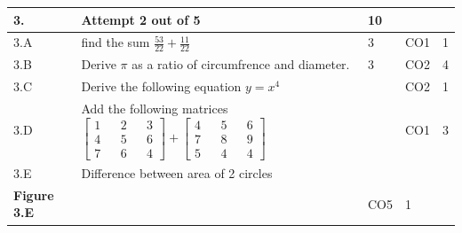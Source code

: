 \documentclass[12pt]{article}
\begin{document}
\begin{longtable}{|L{1cm}|L{8cm}|C{1cm}|C{1cm}|C{1cm}|}\hline
	\bf3. & \bf{Attempt} \bf{2} \bf{out of} \bf{5} & \bf{10}  & & \\ \hline





		3.A &
	find the sum $\frac{53}{22}+\frac{11}{22}$ \newline
			
	 &  3 & CO1 & 1\\ \hline
		3.B &
	Derive $\pi$ as a ratio of circumfrence and diameter. \newline
			
	 &  3 & CO2 & 4\\ \hline
		3.C &
	Derive the following equation $y=x^{4}$ \newline
			
	 &   & CO2 & 1\\ \hline
		3.D &
	Add the following matrices $\begin{bmatrix} 1 && 2 && 3\\ 4 && 5 && 6\\ 7 && 6 && 4 \end{bmatrix}+\begin{bmatrix} 4 && 5 && 6\\ 7 && 8 && 9 \\ 5 && 4 && 4 \end{bmatrix}$ \newline
			
	 &   & CO1 & 3\\ \hline
		3.E &
	Difference between area of 2 circles \newline
			\begin{center}
		\includegraphics[width=4cm,height=3cm]{media/diagrams/diagram.png}\\\bf{Figure }\bf3.E		
	\end{center}
		
	 &   & CO5 & 1\\ \hline
	\end{longtable}
\end{document}
